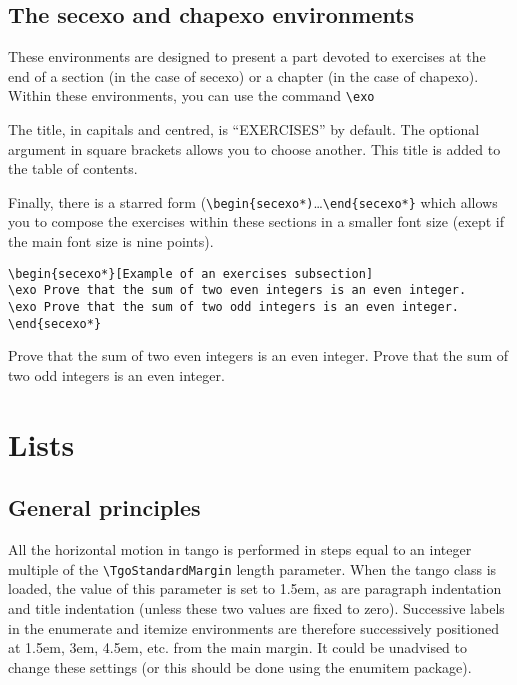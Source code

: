 \documentclass[english,ColorTheme=Red,FontSize=10pt]{tango}
\newcommand\TO[1]{\textsf{#1}}
\begin{document}
\subsection{The secexo and chapexo environments}
These environments are designed to present a part devoted to exercises at the end of a section (in the case of \TO{secexo}) or a chapter (in the case of \TO{chapexo}). Within these environments, you can use the command \verb+\exo+

The title, in capitals and centred, is \enquote{EXERCISES} by default. The optional argument in square brackets allows you to choose another. This title is added to the table of contents.

Finally, there is a starred form (\verb+\begin{secexo*)+…\verb+\end{secexo*}+ which allows you to compose the exercises within these sections in a smaller font size (exept if the main font size is nine points). 

\begin{tcolorbox}
\begin{verbatim}
\begin{secexo*}[Example of an exercises subsection]
\exo Prove that the sum of two even integers is an even integer.
\exo Prove that the sum of two odd integers is an even integer.
\end{secexo*}
\end{verbatim}
\end{tcolorbox}
\begin{secexo*}
\exo Prove that the sum of two even integers is an even integer.
\exo Prove that the sum of two odd integers is an even integer.
\end{secexo*}

\section{Lists}\label{lists}
\subsection{General principles}
All the horizontal motion in tango is performed in steps equal to an integer multiple of the \verb+\TgoStandardMargin+ length parameter. When the tango class is loaded, the value of this parameter is set to 1.5em, as are paragraph indentation and title indentation (unless these two values are fixed to zero). Successive labels in the enumerate and itemize environments are therefore successively positioned at 1.5em, 3em, 4.5em, etc. from the main margin. It could be unadvised to change these settings (or this should be done using the enumitem package).
\end{document}
